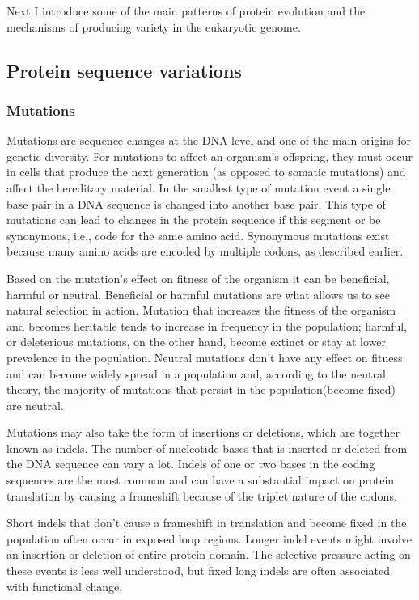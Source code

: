 \documentclass[11pt, a4paper,oneside]{report}
\begin{document}
Next I introduce some of the main patterns of protein evolution and the mechanisms of producing variety in the eukaryotic genome. 

\subsection{Protein sequence variations}
\subsubsection{Mutations}
Mutations are sequence changes at the DNA level and one of the main origins for genetic diversity. For mutations to affect an organism's offspring, they must occur in cells that produce the next generation (as opposed to somatic mutations\cite{britannica}) and affect the hereditary material. In the smallest type of mutation event a single base pair in a DNA sequence is changed into another base pair. This type of mutations can lead to changes in the protein sequence if this segment or be synonymous, i.e., code for the same amino acid. Synonymous mutations exist because many amino acids are encoded by multiple codons, as described earlier.

Based on the mutation's effect on fitness of the organism it can be beneficial, harmful or neutral. Beneficial or harmful mutations are what allows us to see natural selection in action. Mutation that increases the fitness of the organism and becomes heritable tends to increase in frequency in the population; harmful, or deleterious mutations, on the other hand, become extinct or stay at lower prevalence in the population. Neutral mutations don't have any effect on fitness and can become widely spread in a population and, according to the neutral theory, the majority of mutations that persist in the population(become fixed) are neutral. 


Mutations may also take the form of insertions or deletions, which are together known as indels. The number of nucleotide bases that is inserted or deleted from the DNA sequence can vary a lot. Indels of one or two bases in the coding sequences are the most common and can have a substantial impact on protein translation by causing a frameshift because of the triplet nature of the codons.  

 Short indels that don't cause a frameshift in translation and become fixed in the population often occur in exposed loop regions\cite{Kim2010}. Longer indel events might involve an insertion or deletion of entire protein domain. The selective pressure acting on these events is less well understood, but fixed long indels are often associated with functional change\cite{Pascual-Garcia2010}.
\end{document}
